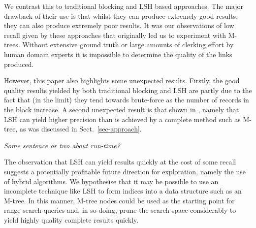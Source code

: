 \documentclass{llncs}
\begin{document}
We contrast this to traditional blocking and LSH based approaches. The major drawback of their use is that whilst they can produce extremely good results, they can also produce extremely poor results. It was our observations of low recall given by these approaches that originally led us to experiment with M-trees. Without extensive ground truth or large amounts of clerking effort by human domain experts it is impossible to determine the quality of the links produced. 

However, this paper also highlights some unexpected results. Firstly, the good quality results yielded by both traditional blocking and LSH are partly due to the fact that (in the limit) they tend towards brute-force as the number of records in the block increase. A second unexpected result is that shown in , namely that LSH can yield higher precision than is achieved by a complete method such as M-tree, as was discussed in Sect.~\ref{sec-approach}.


\emph{Some sentence or two about run-time?}

The observation that LSH can yield results quickly at the cost of some recall suggests a potentially profitable future direction for exploration, namely the use of hybrid algorithms. We hypothesise that it may be possible to use an incomplete technique like LSH to form indices into a data structure such as an M-tree. In this manner, M-tree nodes could be used as the starting point for range-search queries and, in so doing, prune the search space considerably to yield highly quality complete results quickly.




 

\end{document}
